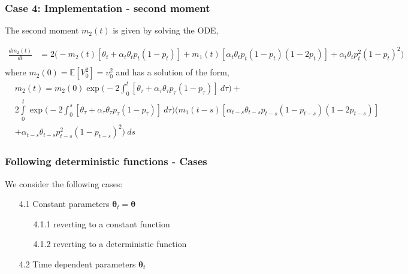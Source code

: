 \documentclass[aspectratio=169]{beamer}\usepackage[utf8]{inputenc}
\newcommand{\E}{\mathbb{E}}
\begin{document}
\begin{frame}\frametitle{ Case 4: Implementation - second moment }
The second moment $m_2(t)$ is given by solving the ODE,

\begin{equation*}
\begin{split}
\frac{d m_{2}(t)}{dt}&=2 \Big( -m_{2}(t) [\theta_t + \alpha_t \theta_t p_t(1-p_t) ] + m_{1}(t)[\alpha_t \theta_t p_t (1-p_t) (1-2p_t)] + \alpha_t \theta_t p_t^2(1-p_t)^2 \Big) \\
\end{split}
\end{equation*}
where $m_2(0) = \E[V_0^2] = v_0^2$ and has a solution of the form,
\begin{equation*}
\begin{split}
&m_{2}(t) = m_{2}(0) \exp \Big( -2 \int_0^t  [\theta_\tau + \alpha_\tau \theta_\tau p_\tau(1-p_\tau) ] \ d\tau  \Big) + \\
& 2 \int\limits_{0}^{t}   \exp \Big( -2 \int_0^s  [\theta_\tau + \alpha_\tau \theta_\tau p_\tau(1-p_\tau) ] \ d\tau \Big) \Big( m_{1}(t-s)[\alpha_{t-s} \theta_{t-s} p_{t-s} (1-p_{t-s}) (1-2p_{t-s})]  \\
& + \alpha_{t-s} \theta_{t-s} p_{t-s}^2(1-p_{t-s})^2 \Big)  \  ds
\end{split}
\end{equation*}

\end{frame}



\begin{frame}\frametitle{Following deterministic functions - Cases }

We consider the following cases:
\begin{itemize}
\item[4.1] Constant parameters $\bm{\theta}_t = \bm{\theta} $
	\begin{itemize}
	\item[4.1.1] reverting to a constant function
	\item[4.1.2] reverting to a deterministic function
	\end{itemize}
\item[4.2] Time dependent parameters $\bm{\theta}_t$
\end{itemize}

\end{frame}
\end{document}
